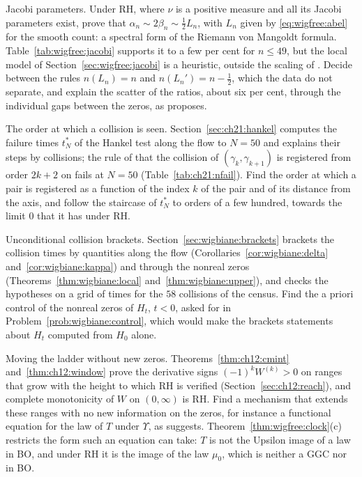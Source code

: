 \begin{problem}\label{prob:wigfree:jacobi}
Jacobi parameters. Under RH, where $\nu$ is a positive measure and all its Jacobi parameters exist, prove that $\alpha_n\sim2\beta_n\sim\frac12L_n$, with $L_n$ given by \eqref{eq:wigfree:abel} for the smooth count: a spectral form of the Riemann von Mangoldt formula. Table~\ref{tab:wigfree:jacobi} supports it to a few per cent for $n\le49$, but the local model of Section~\ref{sec:wigfree:jacobi} is a heuristic, outside the scaling of \cite{KVA99}. Decide between the rules $n(L_n)=n$ and $n(L_n')=n-\frac12$, which the data do not separate, and explain the scatter of the ratios, about six per cent, through the individual gaps between the zeros, as \cite{P26wig} proposes.
\end{problem}

\begin{problem}\label{prob:wigfree:window}
The order at which a collision is seen. Section~\ref{sec:ch21:hankel} computes the failure times $t^*_N$ of the Hankel test along the flow to $N=50$ and explains their steps by collisions; the rule of \cite{P26wig} that the collision of $(\gamma_k,\gamma_{k+1})$ is registered from order $2k+2$ on fails at $N=50$ (Table~\ref{tab:ch21:nfail}). Find the order at which a pair is registered as a function of the index $k$ of the pair and of its distance from the axis, and follow the staircase of $t^*_N$ to orders of a few hundred, towards the limit $0$ that it has under RH.
\end{problem}

\begin{problem}\label{prob:wigfree:collide}
Unconditional collision brackets. Section~\ref{sec:wigbiane:brackets} brackets the collision times by quantities along the flow (Corollaries~\ref{cor:wigbiane:delta} and~\ref{cor:wigbiane:kappa}) and through the nonreal zeros (Theorems~\ref{thm:wigbiane:local} and~\ref{thm:wigbiane:upper}), and checks the hypotheses on a grid of times for the $58$ collisions of the census. Find the a priori control of the nonreal zeros of $H_t$, $t<0$, asked for in Problem~\ref{prob:wigbiane:control}, which would make the brackets statements about $H_t$ computed from $H_0$ alone.
\end{problem}

\begin{problem}\label{prob:wigfree:ladder}
Moving the ladder without new zeros. Theorems~\ref{thm:ch12:cmint} and~\ref{thm:ch12:window} prove the derivative signs $(-1)^kW^{(k)}>0$ on ranges that grow with the height to which RH is verified (Section~\ref{sec:ch12:reach}), and complete monotonicity of $W$ on $(0,\infty)$ is RH. Find a mechanism that extends these ranges with no new information on the zeros, for instance a functional equation for the law of $T$ under $\Upsilon$, as \cite{P26wig} suggests. Theorem~\ref{thm:wigfree:clock}(c) restricts the form such an equation can take: $T$ is not the Upsilon image of a law in BO, and under RH it is the image of the law $\mu_0$, which is neither a GGC nor in BO.
\end{problem}
